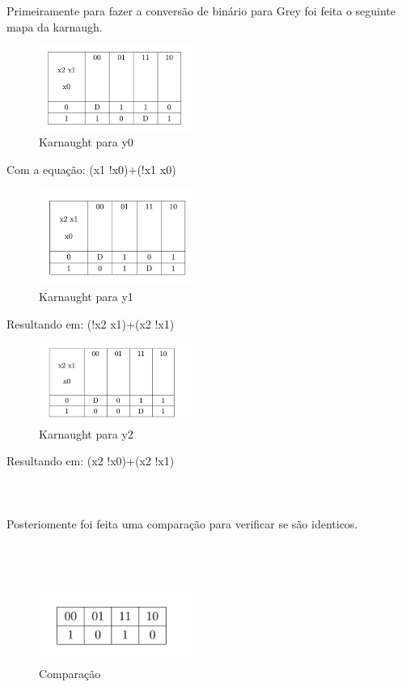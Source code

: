 \documentclass{article}
\begin{document}
Primeiramente para fazer a conversão de binário para Grey foi feita o seguinte mapa da karnaugh.

\begin{figure}[!h]
\centering
\includegraphics[width=5cm]{img02.jpeg}
\caption{Karnaught para y0}
\label{fig:CL_logo}
\end{figure}

Com a equação: (x1 !x0)+(!x1 x0)

\begin{figure}[!h]
\centering
\includegraphics[width=5cm]{fig03.png}
\caption{Karnaught para y1}
\label{fig:CL_logo}
\end{figure}

Resultando em: (!x2 x1)+(x2 !x1)

\begin{figure}[!h]
\centering
\includegraphics[width=5cm]{fig04.png}
\caption{Karnaught para y2}
\label{fig:CL_logo}
\end{figure}

Resultando em: (x2 !x0)+(x2 !x1)
\\
\\
\\
\\
Posteriomente foi feita uma comparação para verificar se são identicos.
\\
\\
\\
\\

\begin{figure}[!h]
\centering
\includegraphics[width=5cm]{fig05.png}
\caption{Comparação}
\label{fig:CL_logo}
\end{figure}
\end{document}
